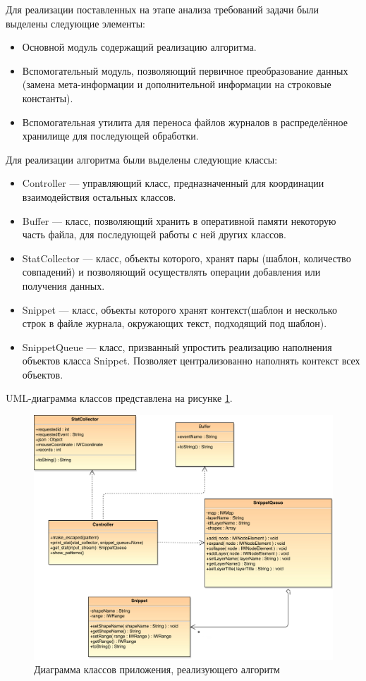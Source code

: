 Для реализации поставленных на этапе анализа требований задачи были выделены
следующие элементы:
\begin{itemize}
  \item Основной модуль содержащий реализацию алгоритма.
  \item Вспомогательный модуль, позволяющий первичное преобразование данных
    (замена мета-информации и дополнительной информации на строковые константы).
  \item Вспомогательная утилита для переноса файлов журналов в распределённое
    хранилище для последующей обработки.
\end{itemize}
Для реализации алгоритма были выделены
следующие классы:
\begin{itemize}
  \item Controller --- управляющий класс, предназначенный для координации
    взаимодействия остальных классов.
  \item Buffer --- класс, позволяющий хранить в оперативной памяти некоторую
    часть файла, для последующей работы с ней других классов.
  \item StatCollector --- класс, объекты которого, хранят пары
    (шаблон, количество совпадений) и позволяющий осуществлять операции
    добавления или получения данных.
  \item Snippet --- класс, объекты которого хранят контекст(шаблон и несколько
    строк в файле журнала, окружающих текст, подходящий под шаблон).
  \item SnippetQueue --- класс, призванный упростить реализацию наполнения
    объектов класса Snippet. Позволяет централизованно наполнять контекст всех
    объектов.
\end{itemize}

UML-диаграмма классов представлена на рисунке \ref{fig:umlclasses}.
\begin{figure}[h]
  \centering
  \includegraphics[width=\textwidth]{pics/arch.png}
  \caption{Диаграмма классов приложения, реализующего алгоритм}
  \label{fig:umlclasses}
\end{figure}

